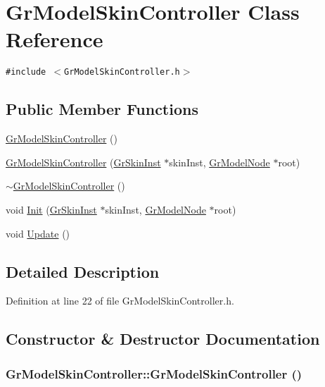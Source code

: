 \hypertarget{class_gr_model_skin_controller}{
\section{GrModelSkinController Class Reference}
\label{class_gr_model_skin_controller}
}
{\tt \#include $<$GrModelSkinController.h$>$}

\subsection*{Public Member Functions}
\begin{CompactItemize}
\item 
\hyperlink{class_gr_model_skin_controller_0eea1cc83085e23628910f465433666f}{GrModelSkinController} ()
\item 
\hyperlink{class_gr_model_skin_controller_ac47bf4d89914bc9b91da6f2abb28236}{GrModelSkinController} (\hyperlink{class_gr_skin_inst}{GrSkinInst} $\ast$skinInst, \hyperlink{class_gr_model_node}{GrModelNode} $\ast$root)
\item 
\hyperlink{class_gr_model_skin_controller_386518c2f1396205b653d09f79f4a8d8}{$\sim$GrModelSkinController} ()
\item 
void \hyperlink{class_gr_model_skin_controller_84a6d50f21bf0731bccc817506827808}{Init} (\hyperlink{class_gr_skin_inst}{GrSkinInst} $\ast$skinInst, \hyperlink{class_gr_model_node}{GrModelNode} $\ast$root)
\item 
void \hyperlink{class_gr_model_skin_controller_66fee72d3a2da8a6abf294b628a56009}{Update} ()
\end{CompactItemize}


\subsection{Detailed Description}


Definition at line 22 of file GrModelSkinController.h.

\subsection{Constructor \& Destructor Documentation}
\hypertarget{class_gr_model_skin_controller_0eea1cc83085e23628910f465433666f}{
\subsubsection[{GrModelSkinController}]{\setlength{\rightskip}{0pt plus 5cm}GrModelSkinController::GrModelSkinController ()}}
\label{class_gr_model_skin_controller_0eea1cc83085e23628910f465433666f}




